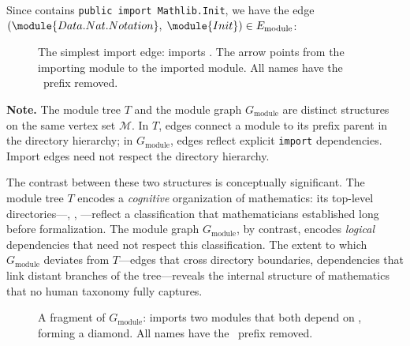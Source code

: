 Since  contains \texttt{public import Mathlib.Init}, we have the edge $(\module{Data.Nat.Notation},\; \module{Init}) \in E_{\mathrm{module}}$:

\begin{figure}[H]
\centering
{}
\caption{The simplest import edge:  imports . The arrow points from the importing module to the imported module. All names have the \ prefix removed.}
\label{fig:single-import-edge}
\end{figure}

\noindent\textbf{Note.}
The module tree $T$ and the module graph $G_{\mathrm{module}}$ are distinct structures on the same vertex set $\mathcal{M}$. In $T$, edges connect a module to its prefix parent in the directory hierarchy; in $G_{\mathrm{module}}$, edges reflect explicit \texttt{import} dependencies. Import edges need not respect the directory hierarchy.

The contrast between these two structures is conceptually significant. The module tree $T$ encodes a \emph{cognitive} organization of mathematics: its top-level directories---, , ---reflect a classification that mathematicians established long before formalization. The module graph $G_{\mathrm{module}}$, by contrast, encodes \emph{logical} dependencies that need not respect this classification. The extent to which $G_{\mathrm{module}}$ deviates from $T$---edges that cross directory boundaries, dependencies that link distant branches of the tree---reveals the internal structure of mathematics that no human taxonomy fully captures.

\begin{figure}[ht]
\centering
{}
\caption{A fragment of $G_{\mathrm{module}}$:  imports two modules that both depend on , forming a diamond. All names have the \ prefix removed.}
\label{fig:import-subgraph}
\end{figure}

